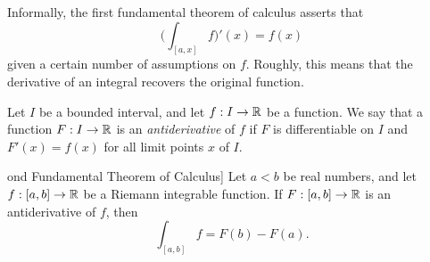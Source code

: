 \begin{note}
  Informally, the first fundamental theorem of calculus asserts that
  \[
    \bigg(\int_{[a, x]} f\bigg)'(x) = f(x)
  \]
  given a certain number of assumptions on \(f\).
  Roughly, this means that the derivative of an integral recovers the original function.
\end{note}

\setcounter{thm}{2}
\begin{defn}[Antiderivatives]\label{11.9.3}
  Let \(I\) be a bounded interval, and let \(f : I \to \mathbb{R}\) be a function.
  We say that a function \(F : I \to \mathbb{R}\) is an \emph{antiderivative} of \(f\) if \(F\) is differentiable on \(I\) and \(F'(x) = f(x)\) for all limit points \(x\) of \(I\).
\end{defn}

\begin{thm}ond Fundamental Theorem of Calculus]\label{11.9.4}
  Let \(a < b\) be real numbers, and let \(f : [a, b] \to \mathbb{R}\) be a Riemann integrable function.
  If \(F : [a, b] \to \mathbb{R}\) is an antiderivative of \(f\), then
  \[
    \int_{[a, b]} f = F(b) - F(a).
  \]
\end{thm}

